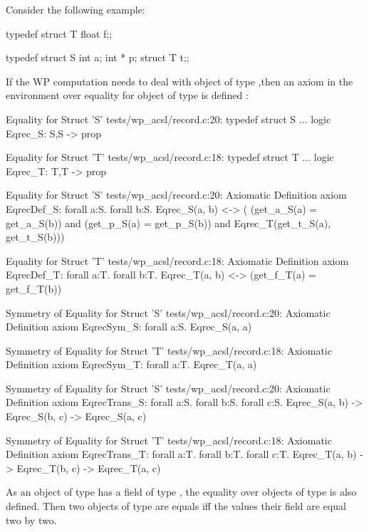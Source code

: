  Consider the following example:
 \begin{ccode}
   typedef struct T {float f;};
   
   typedef struct S { int a; int * p; struct T t;};
 \end{ccode}
 
 If the WP computation needs to deal with object of type
 ,then an axiom in the environment over equality for object
 of type  is defined :
 
 \begin{whycode}
Equality for Struct 'S'
tests/wp_acsl/record.c:20: typedef struct S { ... }
logic Eqrec_S: S,S -> prop

Equality for Struct 'T'
tests/wp_acsl/record.c:18: typedef struct T { ... }
logic Eqrec_T: T,T -> prop

Equality for Struct 'S'
tests/wp_acsl/record.c:20: Axiomatic Definition
axiom EqrecDef_S:
  forall a:S.
  forall b:S.
      Eqrec_S(a, b)
  <-> (    (get_a_S(a) = get_a_S(b))
       and (get_p_S(a) = get_p_S(b))
       and Eqrec_T(get_t_S(a), get_t_S(b)))

Equality for Struct 'T'
tests/wp_acsl/record.c:18: Axiomatic Definition
axiom EqrecDef_T:
  forall a:T.
  forall b:T.
      Eqrec_T(a, b)
  <-> (get_f_T(a) = get_f_T(b))

Symmetry of Equality for Struct 'S'
tests/wp_acsl/record.c:20: Axiomatic Definition
axiom EqrecSym_S: forall a:S.
  Eqrec_S(a, a)

Symmetry of Equality for Struct 'T'
tests/wp_acsl/record.c:18: Axiomatic Definition
axiom EqrecSym_T: forall a:T.
  Eqrec_T(a, a)

Symmetry of Equality for Struct 'S'
tests/wp_acsl/record.c:20: Axiomatic Definition
axiom EqrecTrans_S:
  forall a:S.
  forall b:S.
  forall c:S.
     Eqrec_S(a, b)
  -> Eqrec_S(b, c)
  -> Eqrec_S(a, c)

Symmetry of Equality for Struct 'T'
tests/wp_acsl/record.c:18: Axiomatic Definition
axiom EqrecTrans_T:
  forall a:T.
  forall b:T.
  forall c:T.
     Eqrec_T(a, b)
  -> Eqrec_T(b, c)
  -> Eqrec_T(a, c)


   \end{whycode}

   As an object of type  has a field of type ,
   the equality over objects of type  is also defined.  Then
   two objects of type  are equals iff the values their
   field are equal two by two. \par

